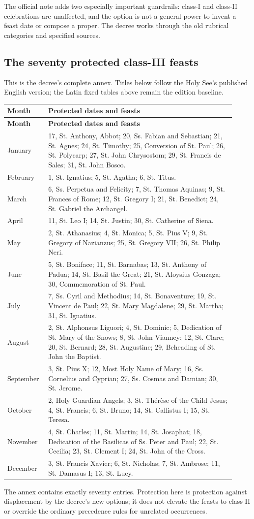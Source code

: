 The official note adds two especially important guardrails: class-I and class-II celebrations are unaffected, and the option is not a general power to invent a feast date or compose a proper. The decree works through the old rubrical categories and specified sources.

\subsection{The seventy protected class-III feasts}

This is the decree's complete annex. Titles below follow the Holy See's published English version; the Latin fixed tables above remain the edition baseline.

\begin{longtable}{@{}p{0.15\linewidth}p{0.77\linewidth}@{}}
\toprule
\textbf{Month} & \textbf{Protected dates and feasts}\\
\midrule
\endfirsthead
\toprule
\textbf{Month} & \textbf{Protected dates and feasts}\\
\midrule
\endhead
\bottomrule
\endfoot
January & 17, St. Anthony, Abbot; 20, Ss. Fabian and Sebastian; 21, St. Agnes; 24, St. Timothy; 25, Conversion of St. Paul; 26, St. Polycarp; 27, St. John Chrysostom; 29, St. Francis de Sales; 31, St. John Bosco.\\
February & 1, St. Ignatius; 5, St. Agatha; 6, St. Titus.\\
March & 6, Ss. Perpetua and Felicity; 7, St. Thomas Aquinas; 9, St. Frances of Rome; 12, St. Gregory I; 21, St. Benedict; 24, St. Gabriel the Archangel.\\
April & 11, St. Leo I; 14, St. Justin; 30, St. Catherine of Siena.\\
May & 2, St. Athanasius; 4, St. Monica; 5, St. Pius V; 9, St. Gregory of Nazianzus; 25, St. Gregory VII; 26, St. Philip Neri.\\
June & 5, St. Boniface; 11, St. Barnabas; 13, St. Anthony of Padua; 14, St. Basil the Great; 21, St. Aloysius Gonzaga; 30, Commemoration of St. Paul.\\
July & 7, Ss. Cyril and Methodius; 14, St. Bonaventure; 19, St. Vincent de Paul; 22, St. Mary Magdalene; 29, St. Martha; 31, St. Ignatius.\\
August & 2, St. Alphonsus Liguori; 4, St. Dominic; 5, Dedication of St. Mary of the Snows; 8, St. John Vianney; 12, St. Clare; 20, St. Bernard; 28, St. Augustine; 29, Beheading of St. John the Baptist.\\
September & 3, St. Pius X; 12, Most Holy Name of Mary; 16, Ss. Cornelius and Cyprian; 27, Ss. Cosmas and Damian; 30, St. Jerome.\\
October & 2, Holy Guardian Angels; 3, St. Thérèse of the Child Jesus; 4, St. Francis; 6, St. Bruno; 14, St. Callistus I; 15, St. Teresa.\\
November & 4, St. Charles; 11, St. Martin; 14, St. Josaphat; 18, Dedication of the Basilicas of Ss. Peter and Paul; 22, St. Cecilia; 23, St. Clement I; 24, St. John of the Cross.\\
December & 3, St. Francis Xavier; 6, St. Nicholas; 7, St. Ambrose; 11, St. Damasus I; 13, St. Lucy.\\
\end{longtable}

The annex contains exactly seventy entries. Protection here is protection against displacement by the decree's new options; it does not elevate the feasts to class II or override the ordinary precedence rules for unrelated occurrences.
